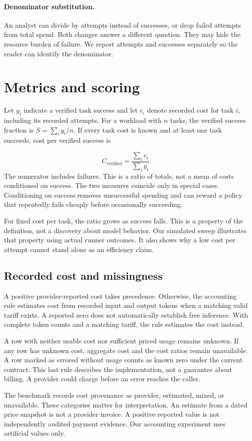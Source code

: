 \documentclass{article}
\begin{document}
\paragraph{Denominator substitution.} An analyst can divide by attempts instead of successes, or drop failed attempts from total spend. Both changes answer a different question. They may hide the resource burden of failure. We report attempts and successes separately so the reader can identify the denominator.
\section{Metrics and scoring}
Let $y_i$ indicate a verified task success and let $c_i$ denote recorded cost for task $i$, including its recorded attempts. For a workload with $n$ tasks, the verified success fraction is $S=\sum_i y_i/n$. If every task cost is known and at least one task succeeds, cost per verified success is\par
\begin{equation}
C_{\mathrm{verified}}=\frac{\sum_i c_i}{\sum_i y_i}.
\end{equation}
The numerator includes failures. This is a ratio of totals, not a mean of costs conditioned on success. The two measures coincide only in special cases. Conditioning on success removes unsuccessful spending and can reward a policy that repeatedly fails cheaply before occasionally succeeding.\par
For fixed cost per task, the ratio grows as success falls. This is a property of the definition, not a discovery about model behavior. Our simulated sweep illustrates that property using actual runner outcomes. It also shows why a low cost per attempt cannot stand alone as an efficiency claim.\par
\subsection{Recorded cost and missingness}
A positive provider-reported cost takes precedence. Otherwise, the accounting rule estimates cost from recorded input and output tokens when a matching valid tariff exists. A reported zero does not automatically establish free inference. With complete token counts and a matching tariff, the rule estimates the cost instead.\par
A row with neither usable cost nor sufficient priced usage remains unknown. If any row has unknown cost, aggregate cost and the cost ratios remain unavailable. A row marked as errored without usage counts as known zero under the current contract. This last rule describes the implementation, not a guarantee about billing. A provider could charge before an error reaches the caller.\par
The benchmark records cost provenance as provider, estimated, mixed, or unavailable. These categories matter for interpretation. An estimate from a dated price snapshot is not a provider invoice. A positive reported value is not independently audited payment evidence. Our accounting experiment uses artificial values only.\par
\end{document}
